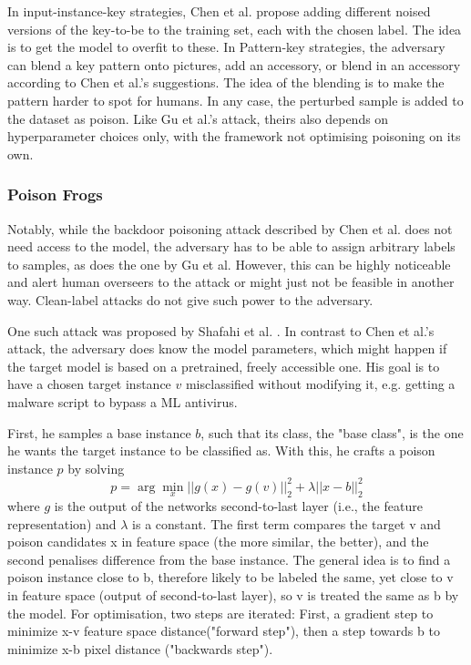 \documentclass[review]{AIM_report}
\begin{document}
In input-instance-key strategies, Chen et al. propose adding different noised versions of the key-to-be to the training set, each with the chosen label. The idea is to get the model to overfit to these.
In Pattern-key strategies, the adversary can blend a key pattern onto pictures, add an accessory, or blend in an accessory according to Chen et al.'s suggestions. The idea of the blending is to make the pattern harder to spot for humans. In any case, the perturbed sample is added to the dataset as poison. 
Like Gu et al.'s attack, theirs also depends on hyperparameter choices only, with the framework not optimising poisoning on its own. 

\subsubsection{Poison Frogs}
Notably, while the backdoor poisoning attack described by Chen et al. does not need access to the model, the adversary has to be able to assign arbitrary labels to samples, as does the one by Gu et al. However, this can be highly noticeable and alert human overseers to the attack or might just not be feasible in another way. Clean-label attacks  do not give such power to the adversary.

One such attack was proposed by Shafahi et al. \cite{shafahi2018poison}. In contrast to Chen et al.'s attack, the adversary does know the model parameters, which might happen if the target model is based on a pretrained, freely accessible one. His goal is to have a chosen target instance \(v\) misclassified without modifying it, e.g. getting a malware script to bypass a ML antivirus. 

First, he samples a base instance \(b\), such that its class, the "base class", is the one he wants the target instance to be classified as. With this, he crafts a poison instance $p$ by solving 
\[
p = \arg\min_x {\lvert \lvert g(x) - g(v) \rvert \rvert_{2}^2
+ \lambda \lvert \lvert x - b \rvert \rvert_{2}^2} 
\]
where \(g\) is the output of the networks second-to-last layer (i.e., the feature representation) and \(\lambda\) is a constant. The first term compares the target v and poison candidates x in feature space (the more similar, the better), and the second penalises difference from the base instance. The general idea is to find a poison instance close to b, therefore likely to be labeled the same, yet close to v in feature space (output of second-to-last layer), so v is treated the same as b by the model. %
For optimisation, two steps are iterated: First, a gradient step to minimize x-v feature space distance("forward step"), then a step towards b to minimize x-b pixel distance ("backwards step").
\end{document}
